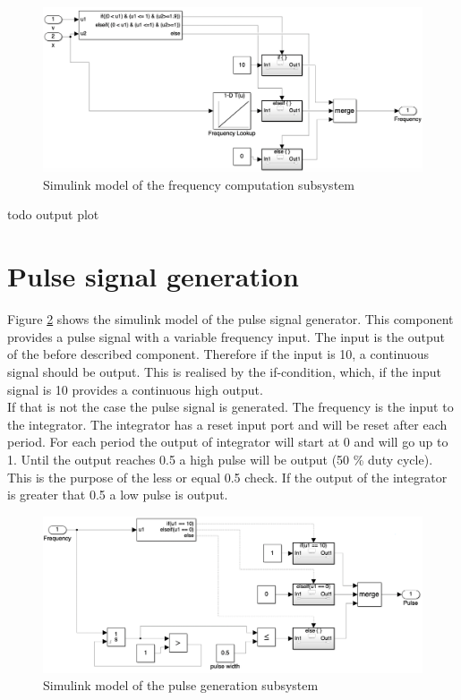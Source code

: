 \begin{figure}[H]
\centering
\includegraphics[width=1\textwidth]{images/D6_Frequency_Computation.png}
\caption{Simulink model of the frequency computation subsystem}
\label{fig:D6_Frequency_Computation}
\end{figure}

todo output plot
\section{Pulse signal generation}\label{sec:D6Signal}
Figure \ref{fig:D6_Pulse_Signal} shows the simulink model of the pulse signal generator.
This component provides a pulse signal with a variable frequency input.
The input is the output of the before described component.
Therefore if the input is 10, a continuous signal should be output.
This is realised by the if-condition, which, if the input signal is 10 provides a continuous high output.\\
If that is not the case the pulse signal is generated.
The frequency is the input to the integrator.
The integrator has a reset input port and will be reset after each period.
For each period the output of integrator will start at 0 and will go up to 1.
Until the output reaches 0.5 a high pulse will be output (50 \% duty cycle).
This is the purpose of the less or equal 0.5 check.
If the output of the integrator is greater that 0.5 a low pulse is output.

\begin{figure}[H]
\centering
\includegraphics[width=1\textwidth]{images/D6_provide_signal.png}
\caption{Simulink model of the pulse generation subsystem}
\label{fig:D6_Pulse_Signal}
\end{figure}

